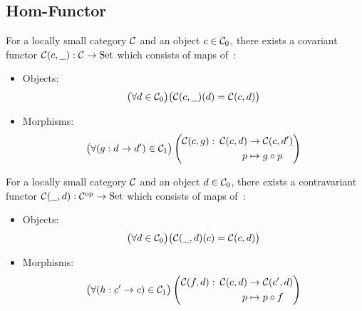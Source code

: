 \subsection{Hom-Functor}

\begin{definition}
  For a locally small category $\mathcal{C}$ and an object $c\in \mathcal{C}_0$, there exists a
  covariant functor $\mathcal{C}(c, \underline{\ \ }) : \mathcal{C} \to \mathrm{Set}$ which consists of maps
  of~\parencite[p.~84]{leinster:basic_category_theory}:
  \begin{itemize}
    \item Objects:
      \[\big(\forall d \in \mathcal{C}_0\big)
        \big(\mathcal{C}(c, \underline{\ \ })(d) = \mathcal{C}(c, d)\big)\]
    \item Morphisms:
      \[
        \begin{gathered}
          \big(\forall (g: d\to d')\in \mathcal{C}_1\big)
          \left(
            \begin{aligned}
              \mathcal{C}(c, g):&&\!\!\! \mathcal{C}(c, d) &\to \mathcal{C}(c, d')\\
              &&p &\mapsto g\circ p
            \end{aligned}
          \right)
        \end{gathered}
      \]
  \end{itemize}
\end{definition}

\begin{definition}
  For a locally small category $\mathcal{C}$ and an object $d\in \mathcal{C}_0$, there exists a
  contravariant functor $\mathcal{C}(\underline{\ \ }, d) : \mathcal{C}^{\mathrm{op}} \to \mathrm{Set}$ which consists
  of maps of~\parencite[p.~90]{leinster:basic_category_theory}:
  \begin{itemize}
    \item Objects:
      \[\big(\forall d \in \mathcal{C}_0\big)
        \big(\mathcal{C}(\underline{\ \ }, d)(c) = \mathcal{C}(c, d)\big)\]
    \item Morphisms:
      \[
        \begin{gathered}
          \big(\forall (h: c'\to c)\in \mathcal{C}_1\big)
          \left(
            \begin{aligned}
              \mathcal{C}(f, d):&&\!\!\! \mathcal{C}(c, d) &\to \mathcal{C}(c', d)\\
              &&p &\mapsto p\circ f
            \end{aligned}
          \right)
        \end{gathered}
      \]
  \end{itemize}
\end{definition}

